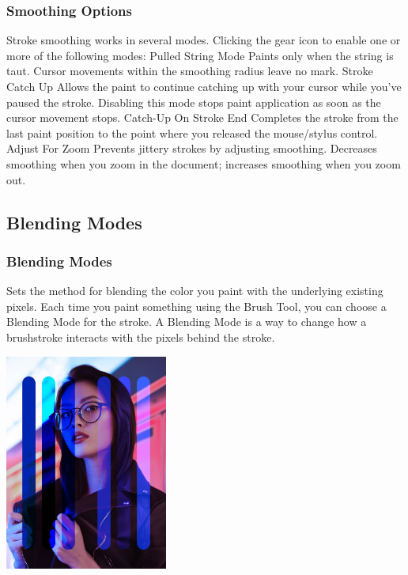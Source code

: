 \documentclass{beamer}
\begin{document}
\begin{frame}
	\frametitle{Smoothing Options}
	\begin{outline}
		\1 Stroke smoothing works in several modes. Clicking the gear icon to enable one or more of the following modes:
		\1 Pulled String Mode
		\2 Paints only when the string is taut. Cursor movements within the smoothing radius leave no mark.
		\1 Stroke Catch Up
		\2 Allows the paint to continue catching up with your cursor while you've paused the stroke. Disabling this mode stops paint application as soon as the cursor movement stops.
		\1 Catch-Up On Stroke End
		\2 Completes the stroke from the last paint position to the point where you released the mouse/stylus control.
		\1 Adjust For Zoom
		\2 Prevents jittery strokes by adjusting smoothing. Decreases smoothing when you zoom in the document; increases smoothing when you zoom out.
	\end{outline}
\end{frame}

\subsection{Blending Modes}	
\begin{frame}
	\frametitle{Blending Modes}
	\begin{outline}
		\1 Sets the method for blending the color you paint with the underlying existing pixels.
		\1 Each time you paint something using the Brush Tool, you can choose a Blending Mode for the stroke. 
		\1 A Blending Mode is a way to change how a brushstroke interacts with the pixels behind the stroke. 
	\end{outline}
	\begin{center}
		\includegraphics[width = 0.4\textwidth]{images/2.5.jpg}
	\end{center}
\end{frame}
\end{document}

